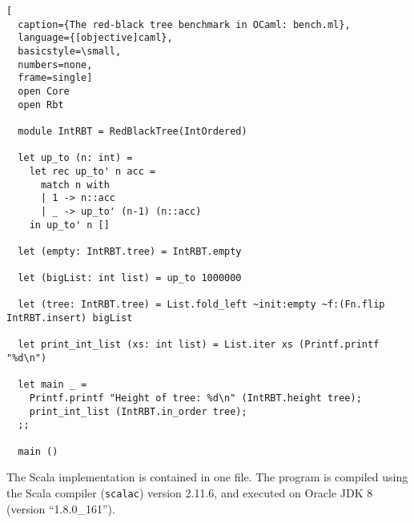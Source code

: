 \begin{lstlisting}[
  caption={The red-black tree benchmark in OCaml: bench.ml},
  language={[objective]caml},
  basicstyle=\small,
  numbers=none,
  frame=single]
  open Core
  open Rbt

  module IntRBT = RedBlackTree(IntOrdered)
       
  let up_to (n: int) = 
    let rec up_to' n acc =
      match n with
      | 1 -> n::acc
      | _ -> up_to' (n-1) (n::acc)
    in up_to' n []
                            
  let (empty: IntRBT.tree) = IntRBT.empty
              
  let (bigList: int list) = up_to 1000000
                    
  let (tree: IntRBT.tree) = List.fold_left ~init:empty ~f:(Fn.flip IntRBT.insert) bigList
                          
  let print_int_list (xs: int list) = List.iter xs (Printf.printf "%d\n")

  let main _ =
    Printf.printf "Height of tree: %d\n" (IntRBT.height tree);
    print_int_list (IntRBT.in_order tree);
  ;;

  main ()
\end{lstlisting}

\newpage
The Scala implementation is contained in one file. The program is compiled using the Scala
compiler (\lstinline{scalac}) version 2.11.6, and executed on Oracle JDK 8 (version ``1.8.0\_161'').


